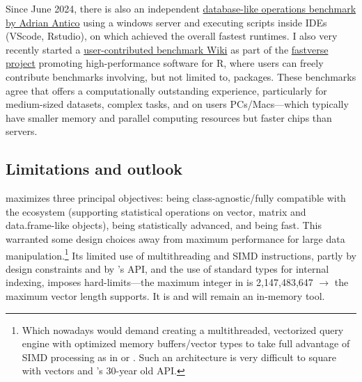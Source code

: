 \documentclass[nojss]{jss} %
\begin{document}
Since June 2024, there is also an independent \href{https://github.com/AdrianAntico/Benchmarks?tab=readme-ov-file#background}{database-like operations benchmark by Adrian Antico} using a windows server and executing scripts inside IDEs (VScode, Rstudio), on which  achieved the overall fastest runtimes. I also very recently started a \href{https://github.com/fastverse/fastverse/wiki/Benchmarks}{user-contributed benchmark Wiki} as part of the \href{https://fastverse.github.io/fastverse/}{fastverse project} promoting high-performance software for R, where users can freely contribute benchmarks involving, but not limited to,  packages. These benchmarks agree that  offers a computationally outstanding experience, particularly for medium-sized datasets, complex tasks, and on users PCs/Macs---which typically have smaller memory and parallel computing resources but faster chips than servers. %

\subsection{Limitations and outlook}

 maximizes three principal objectives: being class-agnostic/fully compatible with the  ecosystem (supporting statistical operations on vector, matrix and data.frame-like objects), being statistically advanced, and being fast. This warranted some design choices away from maximum performance for large data manipulation.\footnote{Which nowadays would demand creating a multithreaded, vectorized query engine with optimized memory buffers/vector types to take full advantage of SIMD processing as in  or . Such an architecture is very difficult to square with  vectors and 's 30-year old  API.} Its limited use of multithreading and SIMD instructions, partly by design constraints and by 's  API, and the use of standard types for internal indexing, imposes hard-limits---the maximum integer in  is 2,147,483,647 $\to$ the maximum vector length  supports. It is and will remain an in-memory tool. \newline
\end{document}
